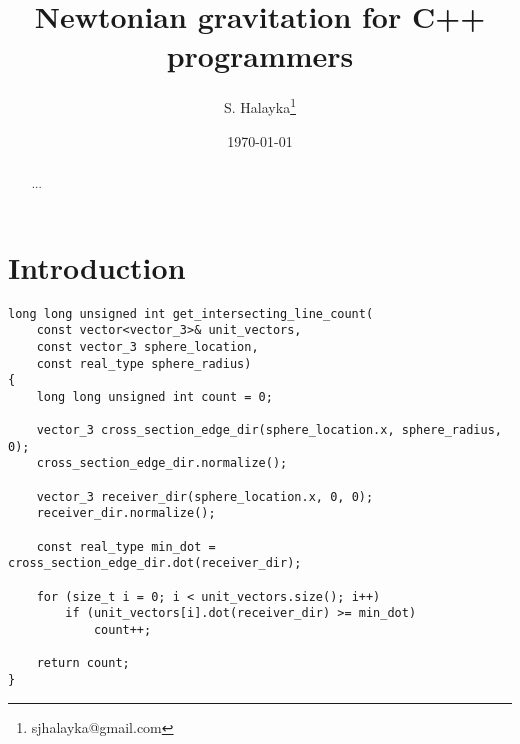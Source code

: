 \documentclass[12pt]{article}
\title{Newtonian gravitation for C++ programmers}
\author{S. Halayka\footnote{sjhalayka@gmail.com}}
\date{\today\;\currenttime}
\begin{document}
 
\maketitle

\begin{abstract}
...
\end{abstract}


\section{Introduction}

\begin{lstlisting}
long long unsigned int get_intersecting_line_count(
	const vector<vector_3>& unit_vectors,
	const vector_3 sphere_location,
	const real_type sphere_radius)
{
	long long unsigned int count = 0;

	vector_3 cross_section_edge_dir(sphere_location.x, sphere_radius, 0);
	cross_section_edge_dir.normalize();

	vector_3 receiver_dir(sphere_location.x, 0, 0);
	receiver_dir.normalize();

	const real_type min_dot = cross_section_edge_dir.dot(receiver_dir);

	for (size_t i = 0; i < unit_vectors.size(); i++)
		if (unit_vectors[i].dot(receiver_dir) >= min_dot)
			count++;

	return count;
}
\end{lstlisting}
\end{document}

